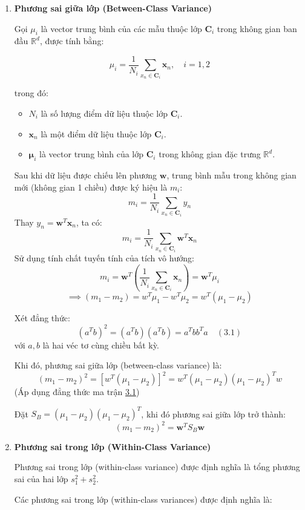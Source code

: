 \documentclass[
  a4paper,
]{article}
\providecommand{\tightlist}{%
  \setlength{\itemsep}{0pt}\setlength{\parskip}{0pt}}
\begin{document}
\begin{enumerate}
\def\labelenumi{\arabic{enumi}.}
\item
  \textbf{Phương sai giữa lớp (Between-Class Variance)}

  Gọi \(\mu_i\) là vector trung bình của các mẫu thuộc lớp
  \(\mathbf{C}_i\) trong không gian ban đầu \(\mathbb{R}^d\), được tính
  bằng:

  \[\mu_i = \frac{1}{N_i} \sum_{x_n \in \mathbf{C}_i} \mathbf{x}_n, \quad i = 1,2\]

  trong đó:

  \begin{itemize}
  \tightlist
  \item
    \(N_i\) là số lượng điểm dữ liệu thuộc lớp \(\mathbf{C}_i\).
  \item
    \(\mathbf{x}_n\) là một điểm dữ liệu thuộc lớp \(\mathbf{C}_i\).
  \item
    \(\boldsymbol{\mu}_i\) là vector trung bình của lớp \(\mathbf{C}_i\)
    trong không gian đặc trưng \(\mathbb{R}^d\).
  \end{itemize}

  Sau khi dữ liệu được chiếu lên phương \(\mathbf{w}\), trung bình mẫu
  trong không gian mới (không gian 1 chiều) được ký hiệu là \(m_i\):
  \[m_i = \frac{1}{N_i} \sum_{x_n \in \mathbf{C}_i} y_n\] Thay
  \(y_n = \mathbf{w}^T \mathbf{x}_n\), ta có:
  \[m_i = \frac{1}{N_i} \sum_{x_n \in \mathbf{C}_i} \mathbf{w}^T \mathbf{x}_n\]
  Sử dụng tính chất tuyến tính của tích vô hướng:
  \[m_i = \mathbf{w}^T \left( \frac{1}{N_i} \sum_{x_n \in \mathbf{C}_i} \mathbf{x}_n \right) = \mathbf{w}^T \mu_i\]
  \[\implies (m_1 - m_2) = w^T\mu_1 - w^T\mu_2 = w^T(\mu_1-\mu_2)\]

  Xét đẳng thức:
  \[(a^T b)^2 = (a^T b)(a^T b) = a^T b b^T a \quad (3.1)\] với \(a, b\)
  là hai véc tơ cùng chiều bất kỳ.

  Khi đó, phương sai giữa lớp (between-class variance) là:
  \[(m_1 - m_2)^2 =[w^T(\mu_1-\mu_2)]^2= w^T(\mu_1-\mu_2)(\mu_1-\mu_2)^Tw\]
  (Áp dụng đẳng thức ma trận \href{}{3.1})

  Đặt \(S_B=(\mu_1-\mu_2)(\mu_1-\mu_2)^T\), khi đó phương sai giữa lớp
  trở thành: \[(m_1 - m_2)^2 = \mathbf{w}^TS_B\mathbf{w}\]
\item
  \textbf{Phương sai trong lớp (Within-Class Variance)}

  Phương sai trong lớp (within-class variance) được định nghĩa là tổng
  phương sai của hai lớp \(s_1^2 + s_2^2\).

  Các phương sai trong lớp (within-class variances) được định nghĩa là:


\end{enumerate}
\end{document}
